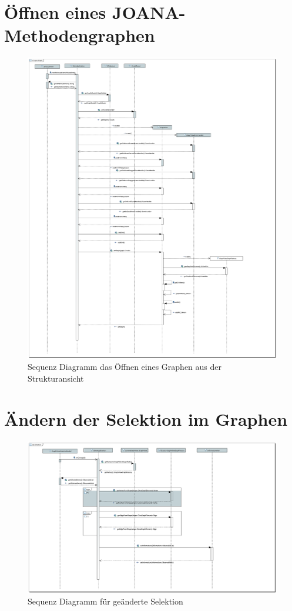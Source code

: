 \section{Öffnen eines JOANA-Methodengraphen}
\begin{figure}[hb]
	\centering
	\includegraphics[width=450pt]{resourcen/SeqDiagramOpenGraph.PDF}
	\caption{Sequenz Diagramm das Öffnen eines Graphen aus der Strukturansicht}
	\label{seq:openMethod}
\end{figure}


\section{Ändern der Selektion im Graphen}
\begin{figure}[hb]
	\centering
	\includegraphics[width=450pt]{resourcen/SeqDiagramSelection.PDF}
	\caption{Sequenz Diagramm für geänderte Selektion}
	\label{seq:selection}
\end{figure}

